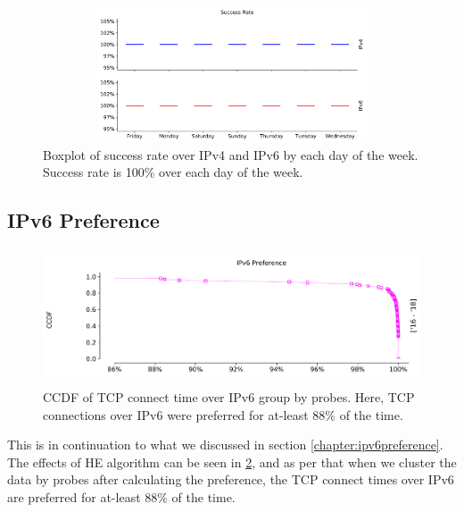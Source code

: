 \begin{figure}[!ht]
	\centering
	\includegraphics[keepaspectratio, height=4cm, width=15cm]{figures/success/netflix-success-rate-boxplot-days.pdf}
	\caption[Success Rate Boxplot for each day of the week]{Boxplot of success rate over IPv4 and IPv6 by each day of the week. Success rate is 100\% over each day of the week.}
	\label{fig:Success Rate boxplot for each day of the week}
\end{figure}
\vspace{\fill}
\FloatBarrier
\subsection{IPv6 Preference}
\begin{figure}[!ht]
	\centering
	\includegraphics[keepaspectratio, height=4cm, width=15cm]{figures/preference/he-preference-ccdf-target.pdf}
	\caption[IPv6 Preference CCDF by Probes]{CCDF of TCP connect time over IPv6 group by probes. Here, TCP connections over IPv6 were preferred for at-least 88\% of the time.}
	\label{fig:IPv6 Preference CCDF by Probes}
\end{figure}

This is in continuation to what we discussed in section \ref{chapter:ipv6preference}. The effects of HE algorithm \cite{rfc6555} can be seen in \cref{fig:IPv6 Preference CCDF by Probes}, and as per that when we cluster the data by probes after calculating the preference, the TCP connect times over IPv6 are preferred for at-least 88\% of the time.
\FloatBarrier
